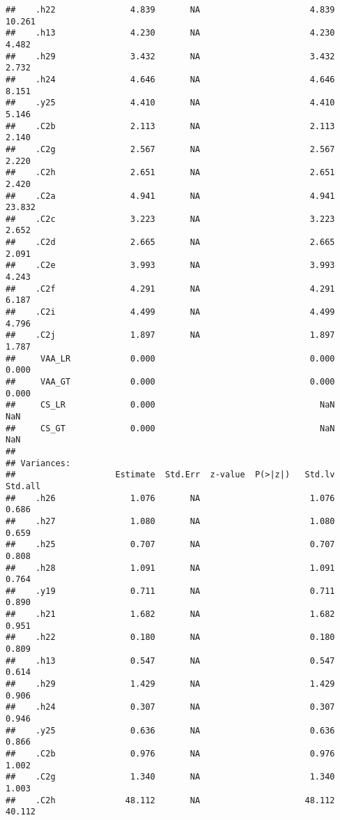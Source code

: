 \documentclass[
]{article}
\begin{document}
\begin{verbatim}
##    .h22               4.839       NA                      4.839   10.261
##    .h13               4.230       NA                      4.230    4.482
##    .h29               3.432       NA                      3.432    2.732
##    .h24               4.646       NA                      4.646    8.151
##    .y25               4.410       NA                      4.410    5.146
##    .C2b               2.113       NA                      2.113    2.140
##    .C2g               2.567       NA                      2.567    2.220
##    .C2h               2.651       NA                      2.651    2.420
##    .C2a               4.941       NA                      4.941   23.832
##    .C2c               3.223       NA                      3.223    2.652
##    .C2d               2.665       NA                      2.665    2.091
##    .C2e               3.993       NA                      3.993    4.243
##    .C2f               4.291       NA                      4.291    6.187
##    .C2i               4.499       NA                      4.499    4.796
##    .C2j               1.897       NA                      1.897    1.787
##     VAA_LR            0.000                               0.000    0.000
##     VAA_GT            0.000                               0.000    0.000
##     CS_LR             0.000                                 NaN      NaN
##     CS_GT             0.000                                 NaN      NaN
## 
## Variances:
##                    Estimate  Std.Err  z-value  P(>|z|)   Std.lv  Std.all
##    .h26               1.076       NA                      1.076    0.686
##    .h27               1.080       NA                      1.080    0.659
##    .h25               0.707       NA                      0.707    0.808
##    .h28               1.091       NA                      1.091    0.764
##    .y19               0.711       NA                      0.711    0.890
##    .h21               1.682       NA                      1.682    0.951
##    .h22               0.180       NA                      0.180    0.809
##    .h13               0.547       NA                      0.547    0.614
##    .h29               1.429       NA                      1.429    0.906
##    .h24               0.307       NA                      0.307    0.946
##    .y25               0.636       NA                      0.636    0.866
##    .C2b               0.976       NA                      0.976    1.002
##    .C2g               1.340       NA                      1.340    1.003
##    .C2h              48.112       NA                     48.112   40.112

\end{verbatim}
\end{document}
